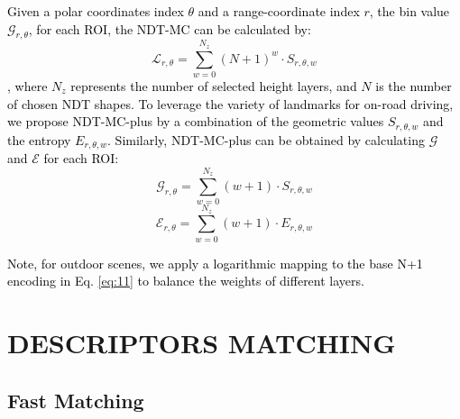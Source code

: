 \documentclass[letterpaper, 10 pt, conference]{ieeeconf}   %
\newcommand\kevin[1]{\textcolor{black}{#1}}
\begin{document}
\kevin{Given a polar coordinates index $\theta$ and a range-coordinate index $r$, the bin value $\mathcal{G}_{r,\theta}$, for each ROI, the NDT-MC can be calculated by:}
\begin{equation}
    \label{mathcal_L_r}
    \mathcal{L}_{r,\theta}=\sum_{w=0}^{N_z}{\left(N+1\right)^w\cdot}S_{r,\theta,w}
\end{equation}
\kevin{, where $N_z$ represents the number of selected height layers, and $N$ is the number of chosen NDT shapes.} 
\kevin{To leverage the variety of landmarks for on-road driving, we propose NDT-MC-plus by a combination of the geometric values $S_{r,\theta,w}$ and the entropy $E_{r,\theta,w}$. 
Similarly, NDT-MC-plus can be obtained by calculating $\mathcal{G}$ and $\mathcal{E}$ for each ROI:}
\begin{equation}
    \mathcal{G}_{r,\theta}=\sum_{w=0}^{N_z}{\left(w+1\right)\cdot}S_{r,\theta,w}
    \label{eq:11}
\end{equation}
\begin{equation}
    \label{mathcal_E_r}
    \mathcal{E}_{r,\theta}=\sum_{w=0}^{N_z}{\left(w+1\right)\cdot}E_{r,\theta,w}
\end{equation}

\kevin{Note, for outdoor scenes, we apply a logarithmic mapping to the base N+1 encoding in Eq. \ref{eq:11} to balance the weights of different layers.}

\section{DESCRIPTORS MATCHING}

\subsection{Fast Matching}


\end{document}
